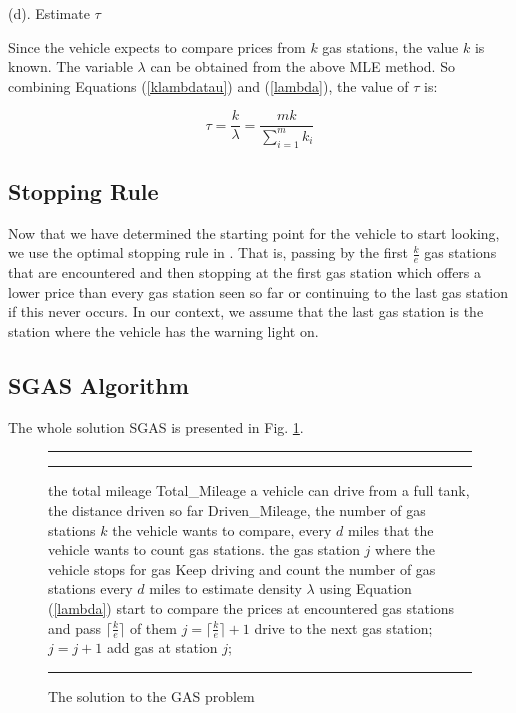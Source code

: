 \documentclass[conference]{IEEEtran}
\theoremstyle{definition}
\begin{document}
\noindent (d). Estimate   $\tau$

Since the vehicle expects to compare prices from $k$ gas stations, the value $k$ is known. The variable $\lambda$ can be obtained from the above MLE method. So combining Equations (\ref{klambdatau}) and (\ref{lambda}),  the value of $\tau$ is:

\begin{equation} \label{tau}
\tau = \frac{k}{\lambda} = \frac{mk}{\sum_{i=1}^{m}k_{i}}
\end{equation}

\subsection{Stopping Rule}
Now that we have determined the starting point for the vehicle to start looking, we use the optimal stopping rule in \cite{Gilbert1966}. That is, passing by the first $\frac {k}{e}$ gas stations that are encountered and then stopping at the first gas station which offers a lower price than every gas station seen so far or continuing to the last gas station if this never occurs. In our context, we assume that the last gas station is the station where the vehicle has the warning light on.

\subsection{SGAS Algorithm}

The whole solution SGAS is presented in Fig. \ref{SGAS}.

\begin{figure}[!hbt]
\vspace{0.2cm}
\hrule \medskip {} \smallskip
\hrule
\smallskip
\begin{algorithmic}[1]
 the total mileage Total\_Mileage a vehicle can drive from a full tank, the distance driven so far Driven\_Mileage, the number of gas stations $k$ the vehicle wants to compare, every $d$ miles that the vehicle wants to count gas stations.
 the gas station $j$ where the vehicle stops for gas
\STATE Keep driving and count the number of gas stations every $d$ miles to estimate density $\lambda$ using Equation (\ref{lambda})
\ENDWHILE
{}
\STATE start to compare the prices at encountered gas stations and pass $\lceil\frac{k}{e}\rceil$ of them
\ENDIF
\STATE $j = \lceil\frac{k}{e}\rceil + 1$
\STATE drive to the next gas station; $j = j+1$
\ENDWHILE
\STATE add gas at station $j$;
\end{algorithmic}
\hrule
\caption{The solution to the GAS problem}
\label{SGAS}
\end{figure}
\end{document}

